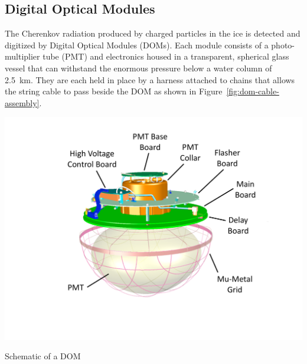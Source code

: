 \subsection{Digital Optical Modules}
\label{sec:dom-daq}
The Cherenkov radiation produced by charged particles in the ice is detected and digitized by Digital Optical Modules (DOMs).
Each module consists of a photo-multiplier tube (PMT) and electronics housed in a transparent, spherical glass vessel that can withstand the enormous pressure below a water column of 2.5~km.
They are each held in place by a harness attached to chains that allows the string cable to pass beside the DOM as shown in Figure~\ref{fig:dom-cable-assembly}.
\begin{marginfigure}
    \includegraphics[width=\textwidth]{figures/icecube/domfig1a-DOM3DModel.pdf}
    \caption{Schematic of a DOM}
    \label{fig:dom-schematic}
\end{marginfigure}
